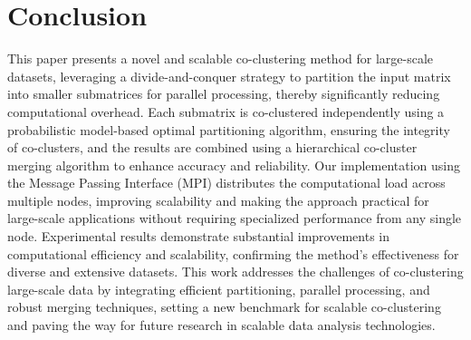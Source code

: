 \documentclass[journal]{IEEEtran}
\begin{document}
\section{Conclusion}
\label{sec:conclusion}
This paper presents a novel and scalable co-clustering method for large-scale datasets, leveraging a divide-and-conquer strategy to partition the input matrix into smaller submatrices for parallel processing, thereby significantly reducing computational overhead. Each submatrix is co-clustered independently using a probabilistic model-based optimal partitioning algorithm, ensuring the integrity of co-clusters, and the results are combined using a hierarchical co-cluster merging algorithm to enhance accuracy and reliability. Our implementation using the Message Passing Interface (MPI) distributes the computational load across multiple nodes, improving scalability and making the approach practical for large-scale applications without requiring specialized performance from any single node. Experimental results demonstrate substantial improvements in computational efficiency and scalability, confirming the method's effectiveness for diverse and extensive datasets. This work addresses the challenges of co-clustering large-scale data by integrating efficient partitioning, parallel processing, and robust merging techniques, setting a new benchmark for scalable co-clustering and paving the way for future research in scalable data analysis technologies.


\printbibliography
\end{document}
